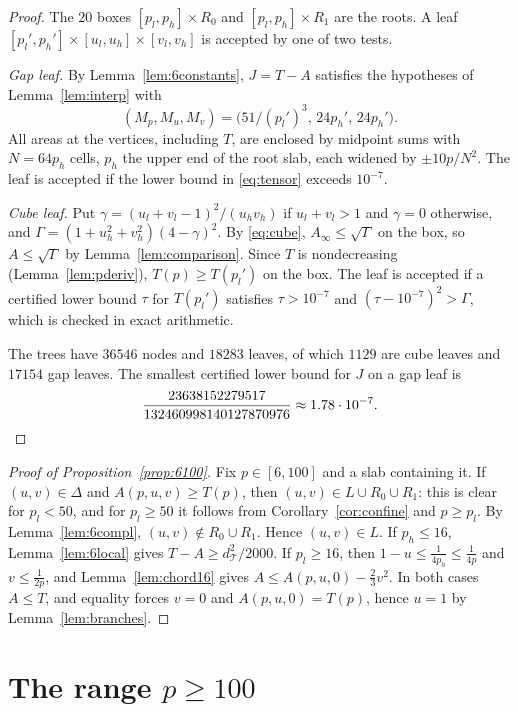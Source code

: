 \documentclass[11pt]{amsart}
\theoremstyle{definition}
\theoremstyle{remark}
\numberwithin{equation}{section}
\newcommand{\cT}{\mathcal{T}}
\begin{document}
\begin{proof}
The $20$ boxes $[p_l,p_h]\times R_0$ and $[p_l,p_h]\times R_1$ are the roots. A leaf $[p_l',p_h']\times[u_l,u_h]\times[v_l,v_h]$ is accepted by one of two tests.

\emph{Gap leaf.} By Lemma~\ref{lem:6constants}, $J=T-A$ satisfies the hypotheses of Lemma~\ref{lem:interp} with
\[
(M_p,M_u,M_v)=\bigl(51/(p_l')^3,\,24p_h',\,24p_h'\bigr).
\]
All areas at the vertices, including $T$, are enclosed by midpoint sums with $N=64p_h$ cells, $p_h$ the upper end of the root slab, each widened by $\pm10p/N^2$. The leaf is accepted if the lower bound in \eqref{eq:tensor} exceeds $10^{-7}$.

\emph{Cube leaf.} Put $\gamma=(u_l+v_l-1)^2/(u_hv_h)$ if $u_l+v_l>1$ and $\gamma=0$ otherwise, and $\Gamma=(1+u_h^2+v_h^2)(4-\gamma)^2$. By \eqref{eq:cube}, $A_\infty\le\sqrt\Gamma$ on the box, so $A\le\sqrt\Gamma$ by Lemma~\ref{lem:comparison}. Since $T$ is nondecreasing (Lemma~\ref{lem:pderiv}), $T(p)\ge T(p_l')$ on the box. The leaf is accepted if a certified lower bound $\tau$ for $T(p_l')$ satisfies $\tau>10^{-7}$ and $(\tau-10^{-7})^2>\Gamma$, which is checked in exact arithmetic.

The trees have $36546$ nodes and $18283$ leaves, of which $1129$ are cube leaves and $17154$ gap leaves. The smallest certified lower bound for $J$ on a gap leaf is
\[
\frac{23638152279517}{132460998140127870976}\approx1.78\cdot10^{-7}.\qedhere
\]
\end{proof}

\begin{proof}[Proof of Proposition~\ref{prop:6100}]
Fix $p\in[6,100]$ and a slab containing it. If $(u,v)\in\Delta$ and $A(p,u,v)\ge T(p)$, then $(u,v)\in L\cup R_0\cup R_1$: this is clear for $p_l<50$, and for $p_l\ge50$ it follows from Corollary~\ref{cor:confine} and $p\ge p_l$. By Lemma~\ref{lem:6compl}, $(u,v)\notin R_0\cup R_1$. Hence $(u,v)\in L$. If $p_h\le16$, Lemma~\ref{lem:6local} gives $T-A\ge d_\cT^2/2000$. If $p_l\ge16$, then $1-u\le\frac1{4p_h}\le\frac1{4p}$ and $v\le\frac1{2p}$, and Lemma~\ref{lem:chord16} gives $A\le A(p,u,0)-\frac23v^2$. In both cases $A\le T$, and equality forces $v=0$ and $A(p,u,0)=T(p)$, hence $u=1$ by Lemma~\ref{lem:branches}.
\end{proof}

\section{The range \texorpdfstring{$p\ge100$}{p>=100}}\label{sec:tail}
\end{document}
